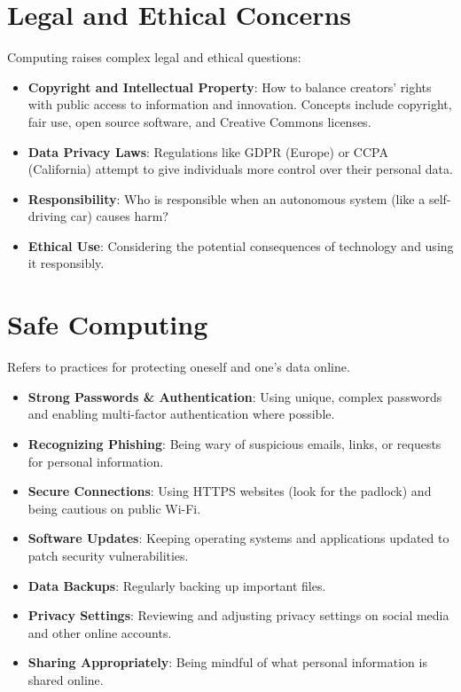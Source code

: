 \documentclass[11pt,oneside]{book}
\begin{document}
\section{Legal and Ethical Concerns}
\label{sec:legal_ethical}
Computing raises complex legal and ethical questions:
\begin{itemize}
    \item \textbf{Copyright and Intellectual Property}: How to balance creators' rights with public access to information and innovation. Concepts include copyright, fair use, open source software, and Creative Commons licenses.
    \item \textbf{Data Privacy Laws}: Regulations like GDPR (Europe) or CCPA (California) attempt to give individuals more control over their personal data.
    \item \textbf{Responsibility}: Who is responsible when an autonomous system (like a self-driving car) causes harm?
    \item \textbf{Ethical Use}: Considering the potential consequences of technology and using it responsibly.
\end{itemize}

\section{Safe Computing}
\label{sec:safe_computing}
Refers to practices for protecting oneself and one's data online.
\begin{itemize}
    \item \textbf{Strong Passwords \& Authentication}: Using unique, complex passwords and enabling multi-factor authentication where possible.
    \item \textbf{Recognizing Phishing}: Being wary of suspicious emails, links, or requests for personal information.
    \item \textbf{Secure Connections}: Using HTTPS websites (look for the padlock) and being cautious on public Wi-Fi.
    \item \textbf{Software Updates}: Keeping operating systems and applications updated to patch security vulnerabilities.
    \item \textbf{Data Backups}: Regularly backing up important files.
    \item \textbf{Privacy Settings}: Reviewing and adjusting privacy settings on social media and other online accounts.
    \item \textbf{Sharing Appropriately}: Being mindful of what personal information is shared online.
\end{itemize}
\end{document}
